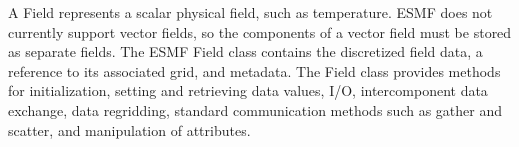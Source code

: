 
A Field represents a scalar physical field, such as temperature.  
ESMF does not currently support vector fields, so the components of 
a vector field must be stored as separate fields.  The ESMF Field
class contains the discretized field data, a reference to its associated
grid, and metadata.  The Field class provides methods for initialization, 
setting and retrieving data values, I/O, intercomponent data 
exchange, data regridding, standard communication methods such as 
gather and scatter, and manipulation of attributes.



